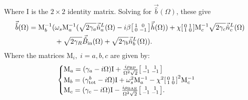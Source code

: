 Where $\mathrm{I}$ is the $2\times2$ identity matrix. Solving for $\vec{\hat{b}}(\Omega)$, these give
\begin{align}
\vec{\hat{b}}(\Omega)=\mathrm{M}_b^{-1}( &\omega_s\mathrm{M}_a^{-1}(\sqrt{2\gamma_a}\vec{\hat{n}}^L_a(\Omega)-i\beta\begin{bsmallmatrix}
1 & 0 \\ 
0 & -1
\end{bsmallmatrix}\vec{\tilde{h}}(\Omega)) + \chi\begin{bsmallmatrix}
0 & 1 \\ 
1 & 0
\end{bsmallmatrix}\mathrm{M}_c^{-1}\sqrt{2\gamma_c}\vec{\hat{n}}^L_c(\Omega)\\&+ \sqrt{2\gamma_R}\vec{\hat{B}}_\mathrm{in}(\Omega) + \sqrt{2\gamma_b}\vec{\hat{n}}^L_b(\Omega)).
\end{align}
Where the matrices $\mathrm{M}_i,\; i=a,b,c$ are given by:
\begin{equation}
\begin{cases}
\mathrm{M}_a = (\gamma_a-i\Omega)\mathrm{I}+\frac{i\rho_\mathrm{RP}}{\Omega^2 \sqrt{2}}\begin{bsmallmatrix}
1 & 1 \\ 
-1 & -1
\end{bsmallmatrix}\\
\mathrm{M}_b = (\gamma^b_\mathrm{tot}-i\Omega)\mathrm{I} + \omega_s^2 \mathrm{M}_a^{-1} - \chi^2\begin{bsmallmatrix}
0 & 1 \\ 
1 & 0
\end{bsmallmatrix}^2 \mathrm{M}_c^{-1} \\
\mathrm{M}_c = (\gamma_c-i\Omega)\mathrm{I}-\frac{i\rho_\mathrm{BAE}}{\Omega^2\sqrt{2}}\begin{bsmallmatrix}
1 & 1 \\ 
-1 & -1
\end{bsmallmatrix}.
\end{cases}
\end{equation}

